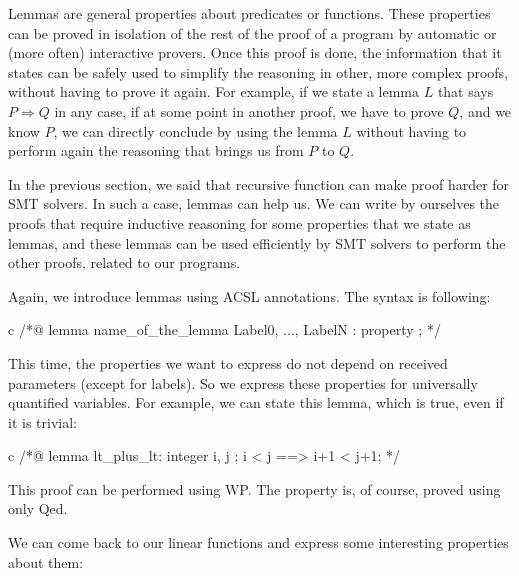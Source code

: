 Lemmas are general properties about predicates or functions. These properties
can be proved in isolation of the rest of the proof of a program by automatic or
(more often) interactive provers. Once this proof is done, the information that
it states can be safely used to simplify the reasoning in other, more complex
proofs, without having to prove it again. For example, if we state a lemma $L$
that says $P \Rightarrow Q$ in any case, if at some point in another proof, we
have to prove $Q$, and we know $P$, we can directly conclude by using the lemma
$L$ without having to perform again the reasoning that brings us from $P$ to
$Q$.


In the previous section, we said that recursive function can make proof harder
for SMT solvers. In such a case, lemmas can help us. We can write by ourselves
the proofs that require inductive reasoning for some properties that we state as
lemmas, and these lemmas can be used efficiently by SMT solvers to perform the
other proofs, related to our programs.




Again, we introduce lemmas using ACSL annotations. The syntax is
following:



\begin{CodeBlock}{c}
/*@
  lemma name_of_the_lemma { Label0, ..., LabelN }:
    property ;
*/
\end{CodeBlock}



This time, the properties we want to express do not depend on received
parameters (except for labels). So we express these properties for universally
quantified variables. For example, we can state this lemma, which is true, even
if it is trivial:



\begin{CodeBlock}{c}
/*@
  lemma lt_plus_lt:
    \forall integer i, j ; i < j ==> i+1 < j+1;
*/
\end{CodeBlock}



This proof can be performed using WP. The property is, of course, proved
using only Qed.





We can come back to our linear functions and express some interesting
properties about them:



